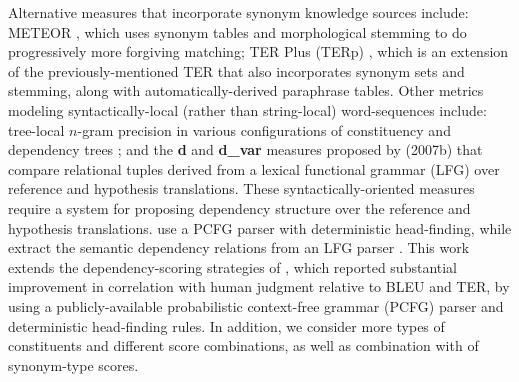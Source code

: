 \documentclass{kluwer}    %
\begin{document}
\begin{article}
Alternative measures that 
incorporate synonym knowledge sources include: METEOR
\cite{banerjee05meteor}, which uses synonym tables and
morphological stemming to do progressively more forgiving matching;
TER Plus (TERp) \cite{snover09terp}, which is an extension of the
previously-mentioned TER that also incorporates synonym sets and stemming, along
with automatically-derived paraphrase tables.  
%
Other metrics modeling syntactically-local (rather than string-local)
word-sequences include: tree-local
$n$-gram precision in various configurations of constituency and
dependency trees \cite{liu05syntaxformteval};
and the \textbf{d} and
\textbf{d\_var} measures proposed by 
(2007b) 
that compare relational tuples derived from a
lexical functional grammar (LFG)
over reference and hypothesis translations.
%
These syntactically-oriented measures require a system for proposing
dependency structure over the reference and hypothesis
translations.  use a
PCFG parser with deterministic head-finding, while 
\cite{owczarzak07evaluatingmt} extract the semantic dependency
relations from an LFG parser \cite{cahill04lfg}.
%
This work extends the dependency-scoring strategies of
, which reported substantial
improvement in correlation with human judgment relative to BLEU and
TER, by using a 
publicly-available probabilistic context-free grammar (PCFG) parser and deterministic head-finding rules. In addition, we consider more types of constituents and different score combinations, as well as combination with of synonym-type scores.
 

\end{article}
\end{document}
